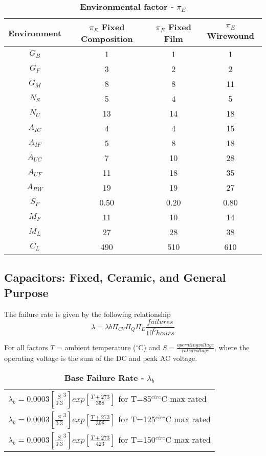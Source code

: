 \begin{table}
\caption{\textbf{Environmental factor -} $\pi_{E}$}
\label{table:environmentalFactor}
\begin{tabular}{|c|c|c|c|} \hline
\textbf{Environment} & $\pi_{E}$ \textbf{Fixed Composition} & $\pi_{E}$ \textbf{Fixed Film} & $\pi_{E}$ \textbf{Wirewound} \\ \hline
$G_{B}$ & 1 & 1 & 1 \\  \hline
$G_{F}$ & 3 & 2 & 2 \\ \hline
$G_{M}$ & 8 & 8 & 11 \\ \hline
$N_{S}$ & 5 & 4 & 5 \\ \hline
$N_{U}$ & 13 & 14 & 18 \\ \hline
$A_{IC}$ & 4 & 4 & 15 \\ \hline
$A_{IF}$ & 5 & 8 & 18 \\ \hline
$A_{UC}$ & 7 & 10 & 28 \\ \hline
$A_{UF}$ & 11 & 18 & 35 \\ \hline
$A_{RW}$ & 19 & 19 & 27 \\ \hline
$S_{F}$ & 0.50 & 0.20 & 0.80 \\ \hline
$M_{F}$ & 11 & 10 & 14 \\ \hline
$M_{L}$ & 27 & 28 & 38 \\ \hline
$C_{L}$ & 490 & 510 & 610 \\ \hline
\end{tabular}
\end{table}

\subsection{Capacitors: Fixed, Ceramic, and General Purpose}
\label{subsection:capacitors-fixed-ceramic-and-general-purpose}

The failure rate is given by the following relationship
$$\lambda = \lambda{b} \Pi_{CV} \Pi_{Q} \Pi_{E} \frac{failures}{10^{6} hours}$$

For all factors $T$ = ambient temperature ($^\circ$C) and 
$S=\frac{operating voltage}{rated voltage}$, where the
operating voltage is the sum of the DC and peak AC voltage.

\begin{table}
\caption{\textbf{Base Failure Rate -} $\lambda_{b}$}
\label{table:baseFailureRate}
\begin{tabular}{l}
$\lambda_b = 0.0003 [\frac{S}{0.3}^{3}] exp [\frac{T+273}{358}]$ for T=85$^{circ}$C max rated \\ 
$\lambda_b = 0.0003 [\frac{S}{0.3}^{3}] exp [\frac{T+273}{398}]$ for T=125$^{circ}$C max rated \\ 
$\lambda_b = 0.0003 [\frac{S}{0.3}^{3}] exp [\frac{T+273}{423}]$ for T=150$^{circ}$C max rated \\ 
\end{tabular}
\end{table}


